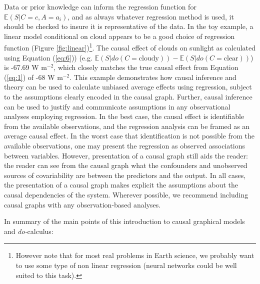 \documentclass[12pt]{article}
\begin{document}
Data or prior knowledge can inform the regression function for
$\mathbb{E}(S | C=c, A=a_i)$, and as always whatever regression method
is used, it should be checked to insure it is representative of the
data. In the toy example, a linear model conditional on cloud appears
to be a good choice of regression function (Figure
\ref{fig:linear})\footnote{However note that for most real problems in
  Earth science, we probably want to use some type of non linear
  regression (neural networks could be well suited to this
  task).}. The causal effect of clouds on sunlight as calculated using
Equation (\ref{eq:6})) (e.g.
$\mathbb{E}(S | do(C = \text{cloudy})) - \mathbb{E}(S | do(C =
\text{clear}))$) is -67.69 W m$^{-2}$, which closely matches the true
causal effect from Equation (\ref{eq:1}) of -68 W m$^{-2}$. This
example demonstrates how causal inference and theory can be used to
calculate unbiased average effects using regression, subject to the
assumptions clearly encoded in the causal graph. Further, causal
inference can be used to justify and communicate assumptions in any
observational analyses employing regression. In the best case, the
causal effect is identifiable from the available observations, and the
regression analysis can be framed as an average causal effect. In the
worst case that identification is not possible from the available
observations, one may present the regression as observed associations
between variables. However, presentation of a causal graph still aids
the reader: the reader can see from the causal graph what the
confounders and unobserved sources of covariability are between the
predictors and the output. In all cases, the presentation of a causal
graph makes explicit the assumptions about the causal dependencies of
the system. Wherever possible, we recommend including causal graphs
with any observation-based analyses.

In summary of the main points of this introduction to causal graphical
models and \textit{do-}calculus:
\end{document}
